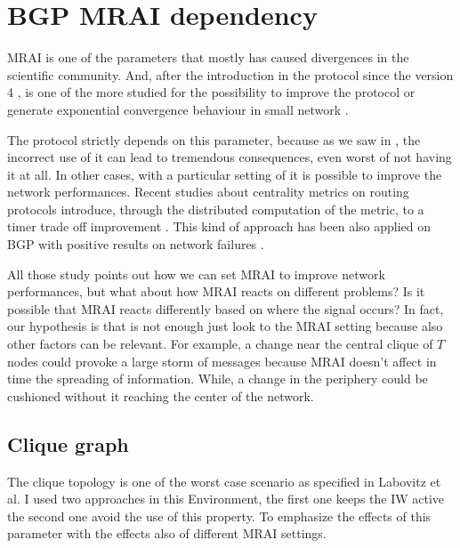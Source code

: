 \chapter{BGP MRAI dependency}
\label{cha:bgp_mrai_experiments}

\ac{MRAI} is one of the parameters that mostly has caused divergences in the 
scientific community.
And, after the introduction in the protocol since the version 4 \cite{rfc4271}
, is one of the more studied for the possibility
to improve the protocol or generate exponential convergence behaviour in small
network \cite{fabrikant2011there}.

The protocol strictly depends on this parameter, because as we saw in ,
the incorrect use of it can lead to tremendous consequences, even worst of not
having it at all.
In other cases, with a particular setting of it is possible to improve the network
performances.
Recent studies about centrality metrics on routing protocols introduce, through 
the distributed computation of the metric, to a 
timer trade off improvement \cite{MaLo18_ToN,GhiMa18_infocom}.
This kind of approach has been also applied on \ac{BGP} with positive results on
network failures \cite{milani2019BGP,milani2020improving}.

All those study points out how we can set \ac{MRAI} to improve network
performances, but what about how \ac{MRAI} reacts on different problems?
Is it possible that \ac{MRAI} reacts differently based on where the signal
occurs?
In fact, our hypothesis is that is not enough just look to the \ac{MRAI} setting
because also other factors can be relevant.
For example, a change near the central clique of $T$ nodes could provoke a large
storm of messages because \ac{MRAI} doesn't affect in time the spreading of information.
While, a change in the periphery could be cushioned without it reaching the center
of the network.

\section{Clique graph}
\label{sec:bgp_mrai_clique}

The clique topology is one of the worst case scenario as specified in Labovitz et al.
\cite{labovitz2000delayed}
I used two approaches in this Environment, the first one keeps the \ac{IW} active
the second one avoid the use of this property.
To emphasize the effects of this parameter with the effects also of different 
\ac{MRAI} settings.

